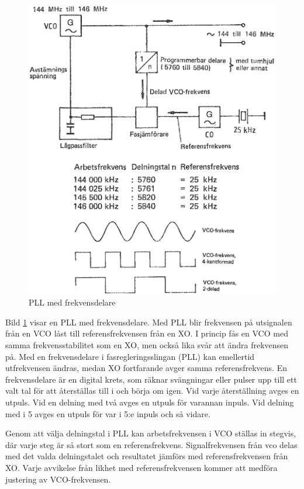 \begin{figure}
\includegraphics[width=\textwidth]{images/cropped_pdfs/bild_2_3-82.pdf}
\caption{PLL med frekvensdelare}
\label{fig:BildII3-82}
\end{figure}

Bild \ref{fig:BildII3-82} visar en PLL med frekvensdelare.
Med PLL blir frekvensen på utsignalen från en VCO låst till referensfrekvensen
från en XO.
I princip fås en VCO med samma frekvensstabilitet som en XO, men också lika
svår att ändra frekvensen på.
Med en frekvensdelare i fasregleringsslingan (PLL) kan emellertid utfrekvensen
ändras, medan XO fortfarande avger samma referensfrekvens.
En frekvensdelare är en digital krets, som räknar svängningar eller pulser upp
till ett valt tal för att återställas till i och börja om igen.
Vid varje återställning avges en utpuls.
Vid en delning med två avges en utpuls för varannan inpuls.
Vid delning med i 5 avges en utpuls för var i 5:e inpuls och så vidare.

Genom att välja delningstal i PLL kan arbetsfrekvensen i VCO ställas
in stegvis, där varje steg är så stort som en referensfrekvens.
Signalfrekvensen från vco delas med det valda delningstalet och resultatet
jämförs med referensfrekvensen från XO.
Varje avvikelse från likhet med referensfrekvensen kommer att
medföra justering av VCO-frekvensen.


